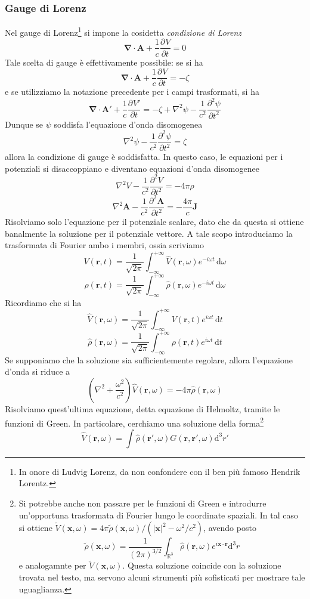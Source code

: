 \documentclass[a4paper,11pt]{book}
\newcommand{\dif}{\mathrm{d}}
\newcommand{\der}[3][]{\frac{\partial ^{#1}#2}{\partial {#3}^{#1}}}
\newcommand{\R}{\mathbb{R}}
\let\oldnabla\nabla
\renewcommand{\nabla}{\vec{\oldnabla}}
\newcommand{\lap}{\oldnabla^2}
\renewcommand{\vec}[1]{\mathbf{#1}}
\newcommand{\fourier}[2]{\frac{1}{\sqrt{2\pi}}\int_{-\infty}^{+\infty}#1\,\dif#2}
\theoremstyle{theorem}
\theoremstyle{definition}
\begin{document}
\subsubsection{Gauge di Lorenz}
Nel gauge di Lorenz\footnote{In onore di Ludvig Lorenz, da non confondere con il ben più famoso Hendrik Lorentz.} si impone la cosidetta \emph{condizione di Lorenz}
\[\nabla\cdot\vec{A}+\frac{1}{c}\der{V}{t}=0\]
Tale scelta di gauge è effettivamente possibile: se si ha
\[\nabla\cdot\vec{A}+\frac{1}{c}\der{V}{t}=-\zeta\]
e se utilizziamo la notazione precedente per i campi trasformati, si ha
\[\nabla\cdot\vec{A}'+\frac{1}{c}\der{V'}{t}=-\zeta+\lap\psi-\frac{1}{c^2}\der[2]{\psi}{t}\]
Dunque se $\psi$ soddisfa l'equazione d'onda disomogenea
\[\lap\psi-\frac{1}{c^2}\der[2]{\psi}{t}=\zeta\]
allora la condizione di gauge è soddisfatta. In questo caso, le equazioni per i potenziali si disaccoppiano e diventano equazioni d'onda disomogenee
\[\lap V-\frac{1}{c^2}\der[2]{V}{t}=-4\pi\rho\]
\[\lap\vec{A}-\frac{1}{c^2}\der[2]{\vec{A}}{t}=-\frac{4\pi}{c}\vec{J}\]
Risolviamo solo l'equazione per il potenziale scalare, dato che da questa si ottiene banalmente la soluzione per il potenziale vettore. A tale scopo introduciamo la trasformata di Fourier ambo i membri, ossia scriviamo
\[V(\vec{r},t)=\fourier{\hat{V}(\vec{r},\omega)e^{-i\omega t}}{\omega}\]
\[\rho(\vec{r},t)=\fourier{\hat{\rho}(\vec{r},\omega)e^{-i\omega t}}{\omega}\]
Ricordiamo che si ha
\[\hat{V}(\vec{r},\omega)=\fourier{V(\vec{r},t)e^{i\omega t}}{t}\]
\[\hat{\rho}(\vec{r},\omega)=\fourier{\rho(\vec{r},t)e^{i\omega t}}{t}\]
Se supponiamo che la soluzione sia sufficientemente regolare, allora l'equazione d'onda si riduce a
\[\left(\lap+\frac{\omega^2}{c^2}\right)\hat{V}(\vec{r},\omega)=-4\pi\hat{\rho}(\vec{r},\omega)\]
Risolviamo quest'ultima equazione, detta equazione di Helmoltz, tramite le funzioni di Green. In particolare, cerchiamo una soluzione della forma\footnote{Si potrebbe anche non passare per le funzioni di Green e introdurre un'opportuna trasformata di Fourier lungo le coordinate spaziali. In tal caso si ottiene
$\tilde{V}(\vec{x},\omega)=4\pi\tilde{\rho}(\vec{x},\omega)/(|\vec{x}|^2-\omega^2/c^2)$, avendo posto
\[\tilde{\rho}(\vec{x},\omega)=\frac{1}{(2\pi)^{3/2}}\int_{\R^3}\hat{\rho}(\vec{r},\omega)e^{i\vec{x}\cdot\vec{r}}\dif^3r\]
e analogamnte per $\tilde{V}(\vec{x},\omega)$. Questa soluzione coincide con la soluzione trovata nel testo, ma servono alcuni strumenti più sofisticati per mostrare tale uguaglianza.}
\[\hat{V}(\vec{r},\omega)=\int\hat{\rho}(\vec{r}',\omega)G(\vec{r},\vec{r}',\omega)\dif^3r'\]
\end{document}
